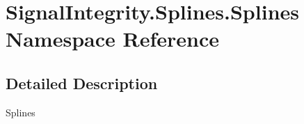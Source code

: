 \hypertarget{namespaceSignalIntegrity_1_1Splines_1_1Splines}{}\section{Signal\+Integrity.\+Splines.\+Splines Namespace Reference}
\label{namespaceSignalIntegrity_1_1Splines_1_1Splines}


\subsection{Detailed Description}
\begin{DoxyVerb}Splines\end{DoxyVerb}
 